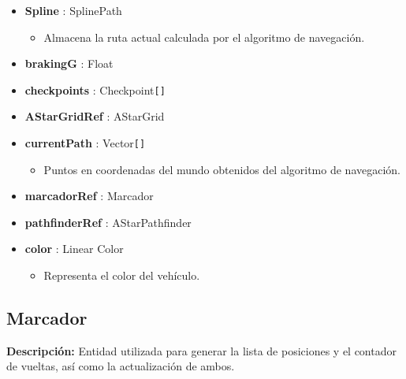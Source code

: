 \begin{itemize}
    \item \textbf{Spline} : SplinePath
    \begin{itemize}
        \item Almacena la ruta actual calculada por el algoritmo de navegación.
    \end{itemize}
    \item \textbf{brakingG} : Float
    \item \textbf{checkpoints} : Checkpoint\verb|[]|
    \item \textbf{AStarGridRef} : AStarGrid
    \item \textbf{currentPath} : Vector\verb|[]|
    \begin{itemize}
        \item Puntos en coordenadas del mundo obtenidos del algoritmo de navegación.
    \end{itemize}
    \item \textbf{marcadorRef} : Marcador
    \item \textbf{pathfinderRef} : AStarPathfinder
    \item \textbf{color} : Linear Color
    \begin{itemize}
        \item Representa el color del vehículo.
    \end{itemize}
\end{itemize}

\subsection{Marcador}
\textbf{Descripción: }Entidad utilizada para generar la lista de posiciones y el contador de vueltas, así como la actualización de ambos.

\bigskip

